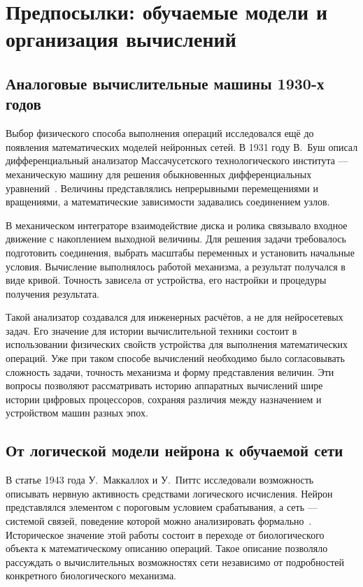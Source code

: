 \section{Предпосылки: обучаемые модели и организация вычислений}

\subsection{Аналоговые вычислительные машины 1930-х годов}

Выбор физического способа выполнения операций исследовался ещё
до появления математических моделей нейронных сетей. В 1931 году
В.~Буш описал дифференциальный анализатор Массачусетского
технологического института — механическую машину для решения
обыкновенных дифференциальных уравнений~\cite{bush1931}.
Величины представлялись непрерывными перемещениями и вращениями,
а математические зависимости задавались соединением узлов.

В механическом интеграторе взаимодействие диска и ролика
связывало входное движение с накоплением выходной величины.
Для решения задачи требовалось подготовить соединения,
выбрать масштабы переменных и установить начальные условия.
Вычисление выполнялось работой механизма, а результат
получался в виде кривой. Точность зависела от устройства,
его настройки и процедуры получения результата.

Такой анализатор создавался для инженерных расчётов,
а не для нейросетевых задач. Его значение для истории
вычислительной техники состоит в использовании физических
свойств устройства для выполнения математических операций.
Уже при таком способе вычислений необходимо было согласовывать
сложность задачи, точность механизма и форму представления величин.
Эти вопросы позволяют рассматривать историю аппаратных вычислений
шире истории цифровых процессоров, сохраняя различия между
назначением и устройством машин разных эпох.

\subsection{От логической модели нейрона к обучаемой сети}

В статье 1943 года У.~Маккаллох и У.~Питтс исследовали возможность описывать
нервную активность средствами логического исчисления. Нейрон представлялся
элементом с пороговым условием срабатывания, а сеть — системой связей,
поведение которой можно анализировать формально~\cite{mcculloch1943}.
Историческое значение этой работы состоит в переходе от биологического
объекта к математическому описанию операций. Такое описание позволяло
рассуждать о вычислительных возможностях сети независимо от подробностей
конкретного биологического механизма.

